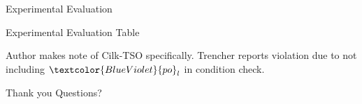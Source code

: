\documentclass[notes, xcolor=dvipsnames]{beamer}
\newcommand{\po}{\textcolor{BlueViolet}{po}}
\begin{document}
    \begin{frame}{Experimental Evaluation}
        \begin{figure}
        \end{figure}
    \end{frame}

    \begin{frame}{Experimental Evaluation Table}
        \begin{figure}
        \end{figure}
        Author makes note of Cilk-TSO specifically. 
        Trencher reports violation due to not including ${\po_{l}}$ in condition check. 
    \end{frame}

    \begin{frame}{Thank you}
        Questions?
    \end{frame}
\end{document}
